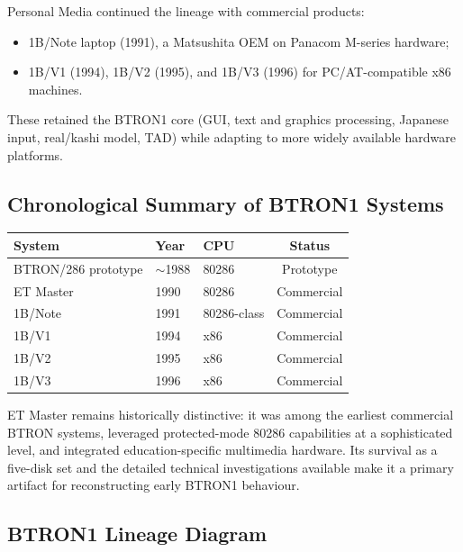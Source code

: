 \documentclass{article}
\begin{document}
Personal Media continued the lineage with commercial products:

\begin{itemize}
  \item 1B/Note laptop (1991), a Matsushita OEM on Panacom M-series hardware;
  \item 1B/V1 (1994), 1B/V2 (1995), and 1B/V3 (1996) for PC/AT-compatible x86 machines.
\end{itemize}

These retained the BTRON1 core (GUI, text and graphics processing, Japanese input, real/kashi model, TAD) while adapting to more widely available hardware platforms.

\subsection{Chronological Summary of BTRON1 Systems}

\begin{center}
\begin{tabular}{@{}lllc@{}}
\toprule
\textbf{System} & \textbf{Year} & \textbf{CPU} & \textbf{Status} \\
\midrule
BTRON/286 prototype & \(\sim\)1988 & 80286 & Prototype \\
ET Master           & 1990 & 80286 & Commercial \\
1B/Note             & 1991 & 80286-class & Commercial \\
1B/V1               & 1994 & x86 & Commercial \\
1B/V2               & 1995 & x86 & Commercial \\
1B/V3               & 1996 & x86 & Commercial \\
\bottomrule
\end{tabular}
\end{center}

ET Master remains historically distinctive: it was among the earliest commercial BTRON systems, leveraged protected-mode 80286 capabilities at a sophisticated level, and integrated education-specific multimedia hardware. Its survival as a five-disk set and the detailed technical investigations available make it a primary artifact for reconstructing early BTRON1 behaviour.

\subsection{BTRON1 Lineage Diagram}
\end{document}
